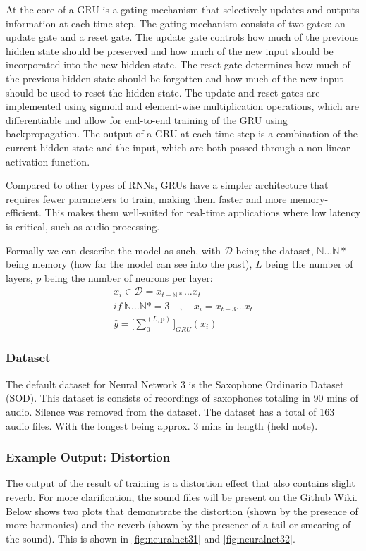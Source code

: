 \documentclass{article}
\begin{document}
At the core of a GRU is a gating mechanism that selectively updates and outputs information at each time step. The gating mechanism consists of two gates: an update gate and a reset gate. The update gate controls how much of the previous hidden state should be preserved and how much of the new input should be incorporated into the new hidden state. The reset gate determines how much of the previous hidden state should be forgotten and how much of the new input should be used to reset the hidden state.\citep{chung2014empirical} The update and reset gates are implemented using sigmoid and element-wise multiplication operations, which are differentiable and allow for end-to-end training of the GRU using backpropagation. The output of a GRU at each time step is a combination of the current hidden state and the input, which are both passed through a non-linear activation function.

Compared to other types of RNNs, GRUs have a simpler architecture that requires fewer parameters to train, making them faster and more memory-efficient. This makes them well-suited for real-time applications where low latency is critical, such as audio processing.

Formally we can describe the model as such, with $\mathcal{D}$ being the dataset, $\mathbb{N} \dots \mathbb{N}*$ being memory (how far the model can see into the past), $L$ being the number of layers, $p$ being the number of neurons per layer:
\begin{align*}
	x_i \in \mathcal{D} = x_{t-\mathbb{N}*} \dots x_{t}                                    \\
	\textit{if} \ \mathbb{N} \dots \mathbb{N} * = 3 \quad, \quad x_i = x_{t-3} \dots x_{t} \\
	\hat{y} = \Bigg[\sum^{(L,\mathbf{p})}_0\Bigg]_{\textit{GRU}}(x_{i})
\end{align*}

\subsubsection{Dataset}
The default dataset for Neural Network 3 is the Saxophone Ordinario Dataset (SOD). This dataset is consists of recordings of saxophones totaling in 90 mins of audio. Silence was removed from the dataset. The dataset has a total of 163 audio files. With the longest being approx. 3 mins in length (held note).



\subsubsection{Example Output: Distortion}
The output of the result of training is a distortion effect that also contains slight reverb. For more clarification, the sound files will be present on the Github Wiki. Below shows two plots that demonstrate the distortion (shown by the presence of more harmonics) and the reverb (shown by the presence of a tail or smearing of the sound). This is shown in \autoref{fig:neuralnet31} and \autoref{fig:neuralnet32}.
\end{document}
